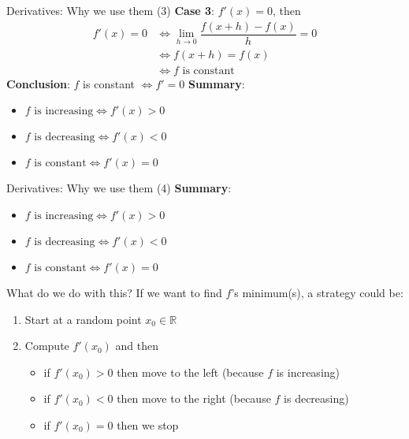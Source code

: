 \documentclass{beamer}
\newcommand{\real}{\mathbb{R}}
\newcommand{\1}[1]{\mathbbm{1}\left[#1\right]}
\begin{document}
\begin{frame}{Derivatives: Why we use them (3)}
\textbf{Case 3}: $f'(x) = 0$, then 
\vfill
\pause
\begin{equation*}
\begin{split}
f'(x) = 0 & \iff \lim_{h \to 0}\dfrac{f(x + h) - f(x)}{h} = 0 \\
& \iff f(x + h) = f(x) \\
& \iff f \text{ is constant}
\end{split}
\end{equation*}
\vfill
\pause
\textbf{Conclusion}: $f$ is constant $\iff f' = 0$
\vfill
\pause
\textbf{Summary}:
\begin{itemize}
	\item $f \text{ is increasing} \iff f'(x) > 0$
	\item $f \text{ is decreasing} \iff f'(x) < 0$
	\item $f \text{ is constant} \iff f'(x) = 0$
\end{itemize}
\end{frame}

\begin{frame}{Derivatives: Why we use them (4)}
\textbf{Summary}:
\begin{itemize}
	\item $f \text{ is increasing} \iff f'(x) > 0$
	\item $f \text{ is decreasing} \iff f'(x) < 0$
	\item $f \text{ is constant} \iff f'(x) = 0$
\end{itemize}
\vfill
\pause
What do we do with this?
\vfill
\pause
If we want to find $f$'s minimum(s), a strategy could be:
\begin{enumerate}
	\item Start at a random point $x_0 \in \real$
	\item Compute $f'(x_0)$ and then
	\begin{itemize}
		\item if $f'(x_0) > 0$ then move to the left (because $f$ is increasing) 
		\item if $f'(x_0) < 0$ then move to the right (because $f$ is decreasing)
		\item if $f'(x_0) = 0$ then we stop
	\end{itemize}
\end{enumerate}
\end{frame}
\end{document}
